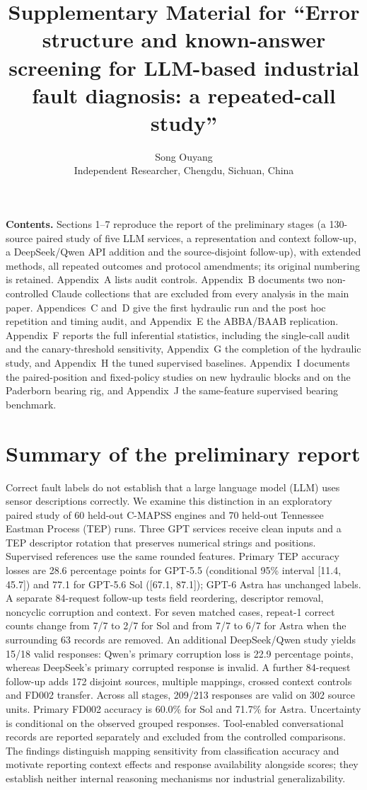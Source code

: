 \documentclass[11pt,a4paper]{article}
\title{Supplementary Material for ``Error structure and known-answer screening for LLM-based industrial fault diagnosis: a repeated-call study''}
\author{Song Ouyang\\[2pt]\small Independent Researcher, Chengdu, Sichuan, China}
\date{}
\begin{document}
\maketitle
\noindent\textbf{Contents.} Sections 1--7 reproduce the report of the preliminary stages (a 130-source paired study of five LLM services, a representation and context follow-up, a DeepSeek/Qwen API addition and the source-disjoint follow-up), with extended methods, all repeated outcomes and protocol amendments; its original numbering is retained. Appendix~A lists audit controls. Appendix~B documents two non-controlled Claude collections that are excluded from every analysis in the main paper. Appendices~C and~D give the first hydraulic run and the post hoc repetition and timing audit, and Appendix~E the ABBA/BAAB replication. Appendix~F reports the full inferential statistics, including the single-call audit and the canary-threshold sensitivity, Appendix~G the completion of the hydraulic study, and Appendix~H the tuned supervised baselines. Appendix~I documents the paired-position and fixed-policy studies on new hydraulic blocks and on the Paderborn bearing rig, and Appendix~J the same-feature supervised bearing benchmark.

\section*{Summary of the preliminary report}
Correct fault labels do not establish that a large language model (LLM) uses sensor descriptions correctly. We examine this distinction in an exploratory paired study of 60 held-out C-MAPSS engines and 70 held-out Tennessee Eastman Process (TEP) runs. Three GPT services receive clean inputs and a TEP descriptor rotation that preserves numerical strings and positions. Supervised references use the same rounded features. Primary TEP accuracy losses are 28.6 percentage points for GPT-5.5 (conditional 95\% interval [11.4, 45.7]) and 77.1 for GPT-5.6 Sol ([67.1, 87.1]); GPT-6 Astra has unchanged labels. A separate 84-request follow-up tests field reordering, descriptor removal, noncyclic corruption and context. For seven matched cases, repeat-1 correct counts change from 7/7 to 2/7 for Sol and from 7/7 to 6/7 for Astra when the surrounding 63 records are removed. An additional DeepSeek/Qwen study yields 15/18 valid responses: Qwen's primary corruption loss is 22.9 percentage points, whereas DeepSeek's primary corrupted response is invalid. A further 84-request follow-up adds 172 disjoint sources, multiple mappings, crossed context controls and FD002 transfer. Across all stages, 209/213 responses are valid on 302 source units. Primary FD002 accuracy is 60.0\% for Sol and 71.7\% for Astra. Uncertainty is conditional on the observed grouped responses. Tool-enabled conversational records are reported separately and excluded from the controlled comparisons. The findings distinguish mapping sensitivity from classification accuracy and motivate reporting context effects and response availability alongside scores; they establish neither internal reasoning mechanisms nor industrial generalizability.
\end{document}
